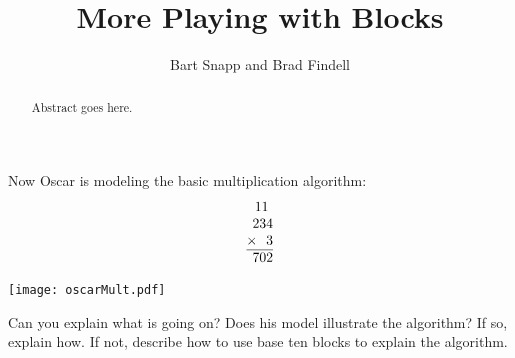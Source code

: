 \documentclass{ximera}
\title{More Playing with Blocks}
\author{Bart Snapp and Brad Findell}
\begin{document}
\begin{abstract}
Abstract goes here.  
\end{abstract}
\maketitle

\label{A:B2} 


\begin{problem}
Now Oscar is modeling the basic multiplication algorithm:
\[
\begin{tabular}{@{}r@{}}
11~~\\
234\\
$\times$~~3\\ \hline
702
\end{tabular}
\]
\begin{image}
\texttt{[image: oscarMult.pdf]}
\end{image}
Can you explain what is going on?  Does his model illustrate the algorithm?  If so, explain how.  If not, describe how to use base ten blocks to explain the algorithm.  
\end{problem}
\end{document}
